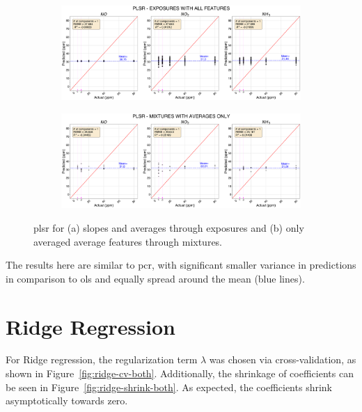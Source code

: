 \begin{figure}[!htb]
	\centering
	
	\begin{subfigure}[t]{1\textwidth}
		\includegraphics[width=1\linewidth]{../figures/plsr-act-vs-pred.png}
		\caption{}
		\label{fig:pls-act-vs-pred} 
	\end{subfigure}
	
	\begin{subfigure}[t]{1\textwidth}
		\includegraphics[width=1\linewidth]{../figures/plsr-act-vs-pred-avg-feat.png}
		\caption{}
		\label{fig:pls-act-vs-pred-avg-feat}
	\end{subfigure}
	
	\caption{\acrshort{plsr} for (a) slopes and averages through exposures and (b) only averaged average features through mixtures.}
	\label{fig:plsr-actual-vs-pred-both}
\end{figure}

The results here are similar to \acrshort{pcr}, with significant smaller variance in predictions in comparison to \acrshort{ols} and equally spread around the mean (blue lines).

\clearpage
\section{Ridge Regression}
\label{sec:results-ridge}

For Ridge regression, the regularization term $\lambda$ was chosen via cross-validation, as shown in Figure~\ref{fig:ridge-cv-both}. Additionally, the shrinkage of coefficients can be seen in Figure~\ref{fig:ridge-shrink-both}. As expected, the coefficients shrink asymptotically towards zero.

